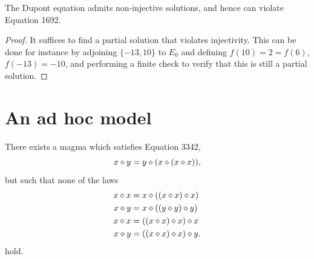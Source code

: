 \begin{corollary}\label{non-inject}\leanok{} The Dupont equation admits non-injective solutions, and hence can violate Equation 1692.
\end{corollary}

\begin{proof} It suffices to find a partial solution that violates injectivity.  This can be done for instance by adjoining $\{-13, 10\}$ to $E_0$ and defining $f(10)= 2 = f(6)$, $f(-13)=-10$, and performing a finite check to verify that this is still a partial solution.
\end{proof}

\section{An ad hoc model}\label{adhoc-model}

\begin{theorem}  There exists a magma which satisfies Equation 3342,
$$ x \diamond y = y \diamond (x \diamond (x \diamond x)),$$
but such that none of the laws
\begin{align*}
  x \diamond x &= x \diamond ((x \diamond x) \diamond x) \\
  x \diamond y &= x \diamond ((y \diamond y) \diamond y) \\
  x \diamond x &= ((x \diamond x) \diamond x) \diamond x \\
  x \diamond y &= ((x \diamond x) \diamond x) \diamond y.
\end{align*}
hold.
\end{theorem}

